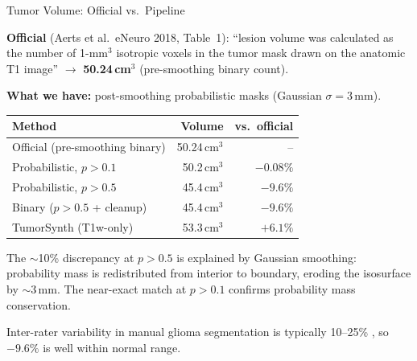 \begin{frame}{Tumor Volume: Official vs.\ Pipeline}

  \textbf{Official} (Aerts et al.\ eNeuro 2018, Table~1):
  ``lesion volume was calculated as the number of 1-mm$^3$ isotropic
  voxels in the tumor mask drawn on the anatomic T1 image''
  $\to$ \textbf{50.24\,cm$^3$} (pre-smoothing binary count).

  \medskip

  \textbf{What we have:} post-smoothing probabilistic masks
  (Gaussian $\sigma = 3$\,mm).

  \medskip

  \begin{tabular}{lrr}
    \toprule
    \textbf{Method} & \textbf{Volume} & \textbf{vs.\ official} \\
    \midrule
    Official (pre-smoothing binary)   & 50.24\,cm$^3$ & -- \\
    Probabilistic, $p > 0.1$          & 50.2\,cm$^3$  & $-0.08\%$ \\
    Probabilistic, $p > 0.5$          & 45.4\,cm$^3$  & $-9.6\%$ \\
    Binary ($p > 0.5$ + cleanup)      & 45.4\,cm$^3$  & $-9.6\%$ \\
    TumorSynth (T1w-only)             & 53.3\,cm$^3$  & $+6.1\%$ \\
    \bottomrule
  \end{tabular}

  \medskip

  The $\sim$10\% discrepancy at $p > 0.5$ is explained by Gaussian
  smoothing: probability mass is redistributed from interior to
  boundary, eroding the isosurface by $\sim$3\,mm.
  The near-exact match at $p > 0.1$ confirms probability mass
  conservation.

  \medskip

  Inter-rater variability in manual glioma segmentation is typically
  10--25\% \cite{Menze2015}, so $-9.6\%$ is well within normal range.

\end{frame}

